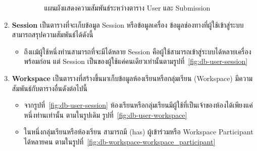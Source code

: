 \documentclass[12pt,oneside,openright,a4paper]{cpe-thai-project}
\begin{document}
\begin{enumerate}
\begin{itemize}
\begin{figure}[H]
                        \centering 
                        \caption[แผนผังแสดงความสัมพันธ์ระหว่างตาราง User และ Submission]{แผนผังแสดงความสัมพันธ์ระหว่างตาราง User และ Submission}
                        \label{fig:db-user-submission}
                    \end{figure}
            \end{itemize}
        \item \textbf{Session}
            เป็นตารางที่จะเก็บข้อมูล Session หรือข้อมูลเครื่อง ข้อมูลช่องทางที่ผู้ใช้เข้าสู่ระบบ สามารถสรุปความสัมพันธ์ได้ดังนี้
                \begin{itemize}
                    \item ถึงเเม้ผู้ใช้หนึ่งท่านสามารถที่จะมีได้หลาย Session คือผู้ใช้สามารถเข้าสู่ระบบได้หลายเครื่องพร้อมก่อน แต่ Session เป็นของผู้ใช้แค่คนเดียวเท่านั้นตามรูปที่~\ref{fig:db-user-session}
                \end{itemize}
        \item \textbf{Workspace}
            เป็นตารางที่สร้างขึ้นมาเก็บข้อมูลห้องเรียนหรือกลุ่มเรียน (Workspace) มีความสัมพันธ์กับตารางอื่นดังต่อไปนี้
                \begin{itemize}
                    \item จากรูปที่~\ref{fig:db-user-session} ห้องเรียนหรือกลุ่มเรียนมีผู้ใช้ที่เป็นเจ้าของห้องได้เพียงแค่หนึ่งท่านเท่านั้น ตามในรูปเดิม รูปที่~\ref{fig:db-user-workspace}
                    \item ในหนึ่งกลุ่มเรียนหรือห้องเรียน สามารถมี (has) ผู้เข้าร่วมหรือ Workspace Participant ได้หลายคน ตามในรูปที่~\ref{fig:db-workspace-workspace_participant}
                    \begin{figure}[H]

\end{figure}
\end{itemize}
\end{enumerate}
\end{document}
